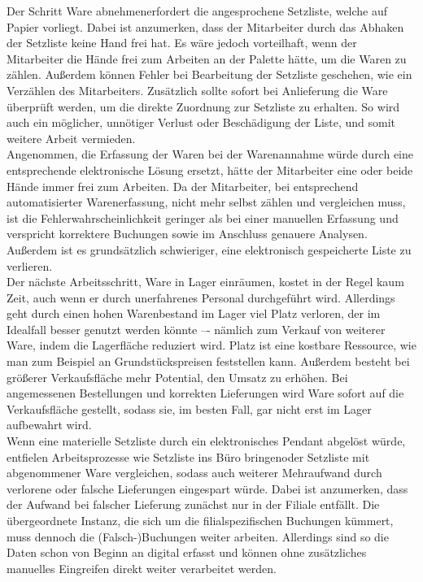 Der Schritt \glqq Ware abnehmen\grqq erfordert die angesprochene Setzliste, welche auf Papier vorliegt. Dabei ist anzumerken, dass der Mitarbeiter durch das Abhaken der Setzliste keine Hand frei hat. Es wäre jedoch vorteilhaft, wenn der Mitarbeiter die Hände frei zum Arbeiten an der Palette hätte, um die Waren zu zählen. Außerdem können Fehler bei Bearbeitung der Setzliste geschehen, wie \zB ein Verzählen des Mitarbeiters. Zusätzlich sollte sofort bei Anlieferung die Ware überprüft werden, um die direkte Zuordnung zur Setzliste zu erhalten. So wird auch ein möglicher, unnötiger Verlust oder Beschädigung der Liste, und somit weitere Arbeit vermieden.\\
Angenommen, die Erfassung der Waren bei der Warenannahme würde durch eine entsprechende elektronische Lösung ersetzt, hätte der Mitarbeiter eine oder beide Hände immer frei zum Arbeiten. Da der Mitarbeiter, bei entsprechend automatisierter Warenerfassung, nicht mehr selbst zählen und vergleichen muss, ist die Fehlerwahrscheinlichkeit geringer als bei einer manuellen Erfassung und verspricht korrektere Buchungen sowie im Anschluss genauere Analysen. Außerdem ist es grundsätzlich schwieriger, eine elektronisch gespeicherte Liste zu verlieren.\\

Der nächste Arbeitsschritt, \glqq Ware in Lager einräumen\grqq , kostet in der Regel kaum Zeit, auch wenn er durch unerfahrenes Personal durchgeführt wird. Allerdings geht durch einen hohen Warenbestand im Lager viel Platz verloren, der im Idealfall besser genutzt werden könnte –- nämlich zum Verkauf von weiterer Ware, indem die Lagerfläche reduziert wird. Platz ist eine kostbare Ressource, wie man zum Beispiel an Grundstückspreisen feststellen kann. Außerdem besteht bei größerer Verkaufsfläche mehr Potential, den Umsatz zu erhöhen. Bei angemessenen Bestellungen und korrekten Lieferungen wird Ware sofort auf die Verkaufsfläche gestellt, sodass sie, im besten Fall, gar nicht erst im Lager aufbewahrt wird.\\

Wenn eine materielle Setzliste durch ein elektronisches Pendant abgelöst würde, entfielen Arbeitsprozesse wie \glqq Setzliste ins Büro bringen\grqq oder \glqq Setzliste mit abgenommener Ware vergleichen\grqq, sodass auch weiterer Mehraufwand durch verlorene oder falsche Lieferungen eingespart würde. Dabei ist anzumerken, dass der Aufwand bei falscher Lieferung zunächst nur in der Filiale entfällt. Die übergeordnete Instanz, die sich um die filialspezifischen Buchungen kümmert, muss dennoch die (Falsch-)Buchungen weiter arbeiten. Allerdings sind so die Daten schon von Beginn an digital erfasst und können ohne zusätzliches manuelles Eingreifen direkt weiter verarbeitet werden.

